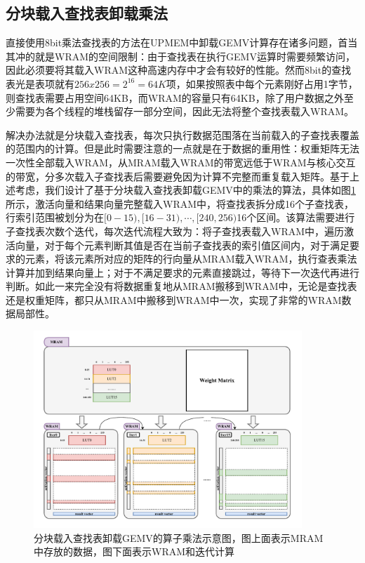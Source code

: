 \subsection{分块载入查找表卸载乘法}
直接使用8bit乘法查找表的方法在UPMEM中卸载GEMV计算存在诸多问题，首当其冲的就是WRAM的空间限制：由于查找表在执行GEMV运算时需要频繁访问，因此必须要将其载入WRAM这种高速内存中才会有较好的性能。然而8bit的查找表光是表项就有$256x256=2^{16}=64K$项，如果按照表中每个元素刚好占用1字节，则查找表需要占用空间64KB，而WRAM的容量只有64KB，除了用户数据之外至少需要为各个线程的堆栈留存一部分空间，因此无法将整个查找表载入WRAM。

解决办法就是分块载入查找表，每次只执行数据范围落在当前载入的子查找表覆盖的范围内的计算。但是此时需要注意的一点就是在于数据的重用性：权重矩阵无法一次性全部载入WRAM，从MRAM载入WRAM的带宽远低于WRAM与核心交互的带宽，分多次载入子查找表后需要避免因为计算不完整而重复载入矩阵。基于上述考虑，我们设计了基于分块载入查找表卸载GEMV中的乘法的算法，具体如图\ref{LUTBlock}所示，激活向量和结果向量完整载入WRAM中，将查找表拆分成16个子查找表，行索引范围被划分为在$[0-15),[16-31),\cdots,[240,256)$16个区间。该算法需要进行子查找表次数个迭代，每次迭代流程大致为：将子查找表载入WRAM中，遍历激活向量，对于每个元素判断其值是否在当前子查找表的索引值区间内，对于满足要求的元素，将该元素所对应的矩阵的行向量从MRAM载入WRAM，执行查表乘法计算并加到结果向量上；对于不满足要求的元素直接跳过，等待下一次迭代再进行判断。如此一来完全没有将数据重复地从MRAM搬移到WRAM中，无论是查找表还是权重矩阵，都只从MRAM中搬移到WRAM中一次，实现了非常的WRAM数据局部性。

\begin{figure}[!htbp]
	\centering
    \includegraphics[width=0.9\textwidth]{figures/LUTBlock.pdf}
	\caption{分块载入查找表卸载GEMV的算子乘法示意图，图上面表示MRAM中存放的数据，图下面表示WRAM和迭代计算}
    \label{LUTBlock}
\end{figure}


